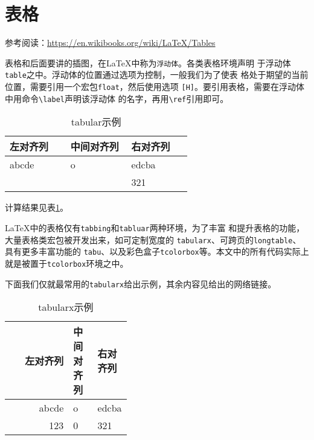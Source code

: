 \section{表格}
参考阅读：\url{https://en.wikibooks.org/wiki/LaTeX/Tables}

表格和后面要讲的插图，在\LaTeX{}中称为\texttt{浮动体}。各类表格环境声明
于浮动体\texttt{table}之中。浮动体的位置通过选项为控制，一般我们为了使表
格处于期望的当前位置，需要引用一个宏包\texttt{float}，然后使用选项
\texttt{[H]}。要引用表格，需要在浮动体中用命令\verb!\label!声明该浮动体
的名字，再用\verb!\ref!引用即可。

\begin{codeout}
\begin{table}[H]
\caption{tabular示例}
\label{table:first}
\begin{center}
\begin{tabular}{>{\raggedleft}p{0.2\linewidth}
  >{\centering}p{0.2\linewidth} p{0.2\linewidth}}
  \toprule
  左对齐列 & 中间对齐列 & 右对齐列 \\
  \hline
  abcde    & o          & edcba    \\
  123      & 0          & 321      \\
\bottomrule
\end{tabular}
\end{center}
\end{table}

计算结果见表\ref{table:first}。


\end{codeout}

\LaTeX{}中的表格仅有\texttt{tabbing}和\texttt{tabluar}两种环境，为了丰富
和提升表格的功能，大量表格类宏包被开发出来，如可定制宽度的
\texttt{tabularx}、可跨页的\texttt{longtable}、具有更多丰富功能的
\texttt{tabu}、以及彩色盒子\texttt{tcolorbox}等。本文中的所有代码实际上
就是被置于\texttt{tcolorbox}环境之中。

下面我们仅就最常用的\texttt{tabularx}给出示例，其余内容见给出的网络链接。

\begin{codeout}
\begin{table}[H]
\caption{tabularx示例}
\begin{center}
\begin{tabularx}{0.7\linewidth}{rp{0.2\linewidth}p{0.2\linewidth}}
  \toprule
  左对齐列 & 中间对齐列 & 右对齐列 \\
  \midrule
  abcde & o & edcba \\
  123 & 0 & 321 \\
  \bottomrule
\end{tabularx}
\end{center}
\end{table}
\end{codeout}

